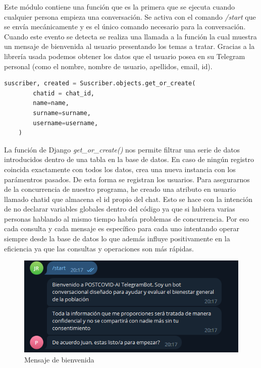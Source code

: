 Este módulo contiene una función que es la primera que se ejecuta cuando cualquier persona empieza una conversación. Se activa con el comando \textit{/start} que se envía mecánicamente y es el único comando necesario para la conversación. Cuando este evento se detecta se realiza una llamada a la función la cual muestra un mensaje de bienvenida al usuario presentando los temas a tratar. Gracias a la librería usada podemos obtener los datos que el usuario posea en su Telegram personal (como el nombre, nombre de usuario, apellidos, email, id).\vspace{0.3cm}

\begin{lstlisting}[language=Python]
    suscriber, created = Suscriber.objects.get_or_create(
        chatid = chat_id,
        name=name,
        surname=surname,
        username=username,
    )
\end{lstlisting}

 La función de Django \textit{get\_or\_create()} nos permite filtrar una serie de datos introducidos dentro de una tabla en la base de datos. En caso de ningún registro coincida exactamente con todos los datos, crea una nueva instancia con los parámentros pasados. De esta forma se registran los usuarios. Para asegurarnos de la concurrencia de nuestro programa, he creado una atributo en usuario llamado chatid que almacena el id propio del chat. Esto se hace con la intención de no declarar variables globales dentro del código ya que si hubiera varias personas hablando al mismo tiempo habría problemas de concurrencia. Por eso cada consulta y cada mensaje es específico para cada uno intentando operar siempre desde la base de datos lo que además influye positivamente en la eficiencia ya que las consultas y operaciones son más rápidas.\vspace{0.3cm}


\begin{figure}[!ht]
    \centering
    \includegraphics[width=1\textwidth]{imagenes/welcome.png}
    \caption{ Mensaje de bienvenida }
    \label{fig:enter-label}
\end{figure}\vspace{1cm}

